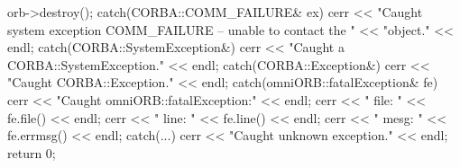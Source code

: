 \documentclass[11pt,twoside,a4paper]{book}
\begin{document}
\begin{cxxlisting}
{{    orb->destroy();
  }
  catch(CORBA::COMM_FAILURE& ex) {
    cerr << "Caught system exception COMM_FAILURE -- unable to contact the "
         << "object." << endl;
  }
  catch(CORBA::SystemException&) {
    cerr << "Caught a CORBA::SystemException." << endl;
  }
  catch(CORBA::Exception&) {
    cerr << "Caught CORBA::Exception." << endl;
  }
  catch(omniORB::fatalException& fe) {
    cerr << "Caught omniORB::fatalException:" << endl;
    cerr << "  file: " << fe.file() << endl;
    cerr << "  line: " << fe.line() << endl;
    cerr << "  mesg: " << fe.errmsg() << endl;
  }
  catch(...) {
    cerr << "Caught unknown exception." << endl;
  }
  return 0;
}
\end{cxxlisting}


\backmatter


\end{document}
